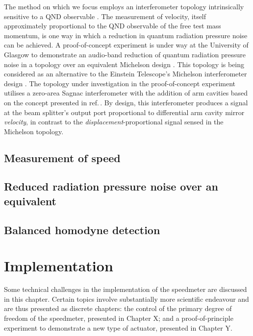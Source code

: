 The method on which we focus employs an interferometer topology intrinsically sensitive to a QND observable \cite{Danilishin2012}. The measurement of velocity, itself approximately proportional to the QND observable of the free test mass momentum, is one way in which a reduction in quantum radiation pressure noise can be achieved. A proof-of-concept experiment is under way at the University of Glasgow to demonstrate an audio-band reduction of quantum radiation pressure noise in a \SSM{} topology over an equivalent Michelson design \cite{Graef2014}. This topology is being considered as an alternative to the Einstein Telescope's Michelson interferometer design \cite{MuellerEbhardt2009a, Voronchev2015}. The topology under investigation in the proof-of-concept experiment utilises a zero-area Sagnac interferometer with the addition of arm cavities based on the concept presented in ref.\,\cite{Chen2003}. By design, this interferometer produces a signal at the beam splitter's output port proportional to differential arm cavity mirror \emph{velocity}, in contrast to the \emph{displacement}-proportional signal sensed in the Michelson topology.

\subsection{Measurement of speed}

\subsection{Reduced radiation pressure noise over an equivalent \MI{}}

\subsection{\label{sec:bhd-intro}Balanced homodyne detection}

\section{Implementation}

Some technical challenges in the implementation of the speedmeter are discussed in this chapter. Certain topics involve substantially more scientific endeavour and are thus presented as discrete chapters: the control of the primary degree of freedom of the speedmeter, presented in Chapter X; and a proof-of-principle experiment to demonstrate a new type of actuator, presented in Chapter Y.

